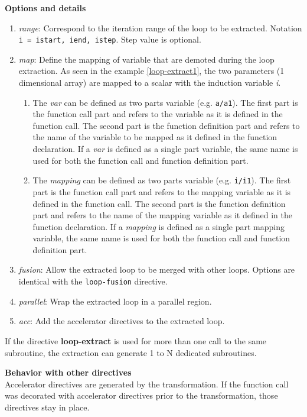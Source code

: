 \textbf{Options and details}
\begin{enumerate}
\item \textit{range}: Correspond to the iteration range of the loop to be extracted.
  Notation \lstinline!i = istart, iend, istep!. Step value is optional.
\item \textit{map}: Define the mapping of variable that are demoted during the loop
  extraction. As seen in the example \ref{loop-extract1}, the two parameters (1 dimensional array)
  are mapped to a scalar with the induction variable \textit{i}.
  \begin{enumerate}
    \item The \textit{var} can be defined as two parts variable (e.g. \lstinline!a/a1!). The
    first part is the function call part and refers to the variable as it is
    defined in the function call. The second part is the function definition
    part and refers to the name of the variable to be mapped as it defined in
    the function declaration. If a \textit{var} is defined as a single part variable,
    the same name is used for both the function call and function definition
    part.
    \item The \textit{mapping} can be defined as two parts variable (e.g. \lstinline!i/i1!). The
    first part is the function call part and refers to the mapping variable as
    it is defined in the function call. The second part is the function
    definition part and refers to the name of the mapping variable as it defined
    in the function declaration. If a \textit{mapping} is defined as a single part
    mapping variable, the same name is used for both the function call and
    function definition part.
    \end{enumerate}
\item \textit{fusion}: Allow the extracted loop to be merged with other loops.
Options are identical with the \lstinline!loop-fusion! directive.
\item \textit{parallel}: Wrap the extracted loop in a parallel region.
\item \textit{acc}: Add the accelerator directives to the extracted loop.
\end{enumerate}

If the directive \textbf{loop-extract} is used for more than one call to the same
subroutine, the extraction can generate 1 to N dedicated subroutines.

\textbf{Behavior with other directives}\\
Accelerator directives are generated by the transformation. If the function call was decorated
with accelerator directives prior to the transformation, those directives stay in place.

